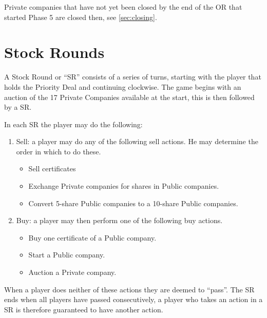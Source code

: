 \documentclass[a4paper,twocolumn]{article}
\begin{document}
Private companies that have not yet been closed by the end of the OR that
started Phase 5 are closed then, see \autoref{sec:closing}.

\section{Stock Rounds}
A Stock Round or ``SR'' consists of a series of turns, starting with the player
that holds the Priority Deal and continuing clockwise. The game begins with an
auction of the 17 Private Companies available at the start, this is then
followed by a SR.

In each SR the player may do the following:
\begin{enumerate}
	\item Sell: a player may do any of the following sell actions. He may
	determine the order in which to do these.
	\begin{itemize}
		\item Sell certificates
		\item Exchange Private companies for shares in Public companies.
		\item Convert 5-share Public companies to a 10-share Public companies.
	\end{itemize}
	\item Buy: a player may then perform one of the following buy actions.
	\begin{itemize}
		\item Buy one certificate of a Public company.
		\item Start a Public company.
		\item Auction a Private company.
	\end{itemize}
\end{enumerate}

When a player does neither of these actions they are deemed to ``pass''. The
SR ends when all players have passed consecutively, a player who takes an action
in a SR is therefore guaranteed to have another action.
\end{document}
